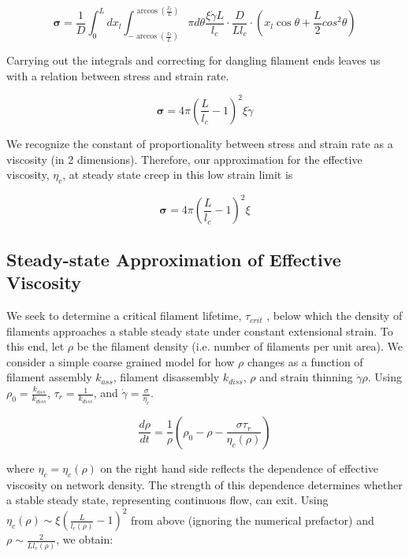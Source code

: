 \documentclass[10pt,letterpaper]{article}
\begin{document}
\begin{equation}
\mathbf{\sigma} =  \frac{1}{D} \int_0^L dx_l \int_{-\arccos (\frac{x_l}{L})}^{\arccos (\frac{x_l}{L})}\pi d\theta \frac{\xi \dot \gamma L}{l_c} \cdot \frac{D}{Ll_c}\cdot (x_l \cos \theta + \frac{L}{2} cos^2\theta)
\end{equation}

Carrying out the integrals and correcting for dangling filament ends leaves us with a relation between stress and strain rate.

\begin{equation}
\mathbf{\sigma} = 4 \pi \left ( \frac{ L}{l_c}-1 \right)^2 \xi \dot \gamma 
\end{equation}

We recognize the constant of proportionality between stress and strain rate as a viscosity (in 2 dimensions).  Therefore, our approximation for the effective viscosity, $\eta_{c}$, at steady state creep in this low strain limit is

\begin{equation}
\label{lin_eqn}
\mathbf{\sigma} = 4 \pi \left ( \frac{ L}{l_c}-1 \right)^2 \xi
\end{equation}



\subsection{Steady-state Approximation of Effective Viscosity}
We seek to determine a critical filament lifetime, $\tau_{crit}$ , below which the density of filaments approaches a stable steady state under constant extensional strain. To this end, let $\rho$ be the filament density (i.e. number of filaments per unit area). We consider a simple coarse grained model for how $\rho$ changes as a function of filament assembly $k_{ass}$, filament disassembly $k_{diss}$, $\rho$ and strain thinning $\dot{\gamma}\rho$. Using $\rho_0 = \frac{k_{ass}}{k_{diss}}$, $\tau_r=\frac{1}{k_{diss}}$, and $\dot{\gamma}=\frac{\sigma}{\eta_c}$.

\begin{equation}
\label{drho_1}
\frac{d\rho}{dt}=\frac{1}{\rho}\left ( \rho_0 - \rho - \frac{\sigma \tau_r}{\eta_c(\rho)}\right )
\end{equation}

where $\eta_c = \eta_c(\rho)$ on the right hand side reflects the dependence of effective viscosity on network density.  The strength of this dependence determines whether a stable steady state, representing continuous flow, can exit.  Using $\eta_c(\rho)\sim \xi \left ( \frac{L}{l_c(\rho)} -1 \right )^2$ from above (ignoring the numerical prefactor) and $\rho \sim \frac{2}{L l_c(\rho)}$, we obtain:
\end{document}
